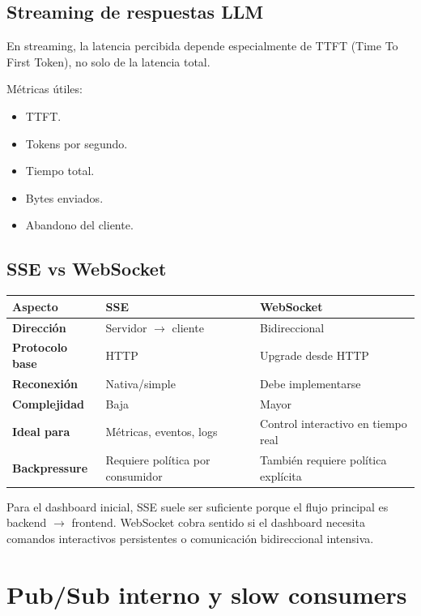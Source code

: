 \documentclass[11pt,a4paper]{article}
\begin{document}
\subsection{Streaming de respuestas LLM}

En streaming, la latencia percibida depende especialmente de TTFT (Time To First Token), no solo de la latencia total.

Métricas útiles:

\begin{itemize}
  \item TTFT.
  \item Tokens por segundo.
  \item Tiempo total.
  \item Bytes enviados.
  \item Abandono del cliente.
\end{itemize}

\subsection{SSE vs WebSocket}

\begin{table}[h]
\centering
\small
\begin{tabularx}{\textwidth}{>{\bfseries}p{3cm} X X}
\toprule
Aspecto & SSE & WebSocket \\
\midrule
Dirección & Servidor $\rightarrow$ cliente & Bidireccional \\
Protocolo base & HTTP & Upgrade desde HTTP \\
Reconexión & Nativa/simple & Debe implementarse \\
Complejidad & Baja & Mayor \\
Ideal para & Métricas, eventos, logs & Control interactivo en tiempo real \\
Backpressure & Requiere política por consumidor & También requiere política explícita \\
\bottomrule
\end{tabularx}
\end{table}

Para el dashboard inicial, SSE suele ser suficiente porque el flujo principal es backend $\rightarrow$ frontend. WebSocket cobra sentido si el dashboard necesita comandos interactivos persistentes o comunicación bidireccional intensiva.

\section{Pub/Sub interno y slow consumers}
\end{document}
